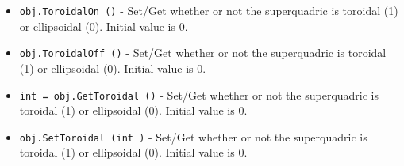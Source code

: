 \begin{itemize}
\item  \verb|obj.ToroidalOn ()| -  Set/Get whether or not the superquadric is toroidal (1) or ellipsoidal (0).
 Initial value is 0.

\item  \verb|obj.ToroidalOff ()| -  Set/Get whether or not the superquadric is toroidal (1) or ellipsoidal (0).
 Initial value is 0.

\item  \verb|int = obj.GetToroidal ()| -  Set/Get whether or not the superquadric is toroidal (1) or ellipsoidal (0).
 Initial value is 0.

\item  \verb|obj.SetToroidal (int )| -  Set/Get whether or not the superquadric is toroidal (1) or ellipsoidal (0).
 Initial value is 0.

\end{itemize}
